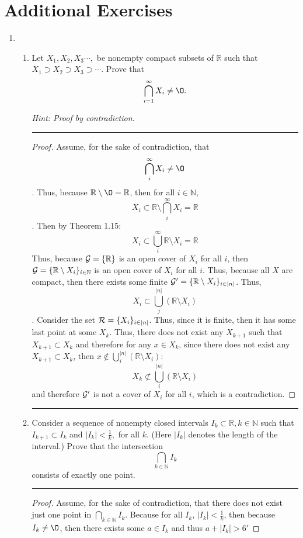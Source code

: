 \documentclass[openany, amssymb, psamsfonts]{amsart}
\newcommand{\bbN}{\mathbb{N}}
\newcommand{\bbR}{\mathbb{R}}
\renewcommand{\emptyset}{\O}
\newcommand{\sm}{\setminus}
\theoremstyle{definition}
\numberwithin{equation}{section}
\begin{document}
\section*{Additional Exercises}
\begin{enumerate}
\item
\begin{enumerate}
\item Let $X_1,X_2, X_3\cdots,$ be nonempty compact subsets of $\bbR$ such that 
$X_1\supset X_2\supset X_3\supset\cdots .$
Prove that $$\bigcap_{i=1}^\infty X_i\neq \emptyset.$$ 

{\it Hint: Proof by contradiction.}
\vspace{4pt}     \hrule   \vspace{4pt}  \begin{proof}
Assume, for the sake of contradiction, that $$\bigcap_i^{\infty}X_i \neq \emptyset$$. Thus, because $\bbR \sm \emptyset = \bbR$, then for all $i\in \bbN$, $$X_i \subset \bbR \sm \bigcap_i^{\infty}X_i = \bbR$$. Then by Theorem 1.15:
$$X_i \subset \bigcup_i^\infty \bbR \sm X_i = \bbR$$
Thus, because $\cG = \{\bbR\}$ is an open cover of $X_i$ for all $i$, then $\cG = \{\bbR\sm X_i\}_{i\in \bbN}$ is an open cover of $X_i$ for all $i$. Thus, because all $X$ are compact, then there exists some finite $\cG' = \{\bbR \sm X_i\}_{i\in |n|}$. Thus, $$X_i \subset \bigcup_j^{|n|}(\bbR \sm X_i)$$. Consider the set $\mathcal R = \{X_i\}_{i\in |n|}$. Thus, since it is finite, then it has some last point at some $X_k$. Thus, there does not exist any $X_{k+1}$ such that $X_{k+1}\subset X_k$ and therefore for any $x\in X_k$, since there does not exist any $X_{k+1}\subset X_k$, then $x\notin \bigcup_i^{|n|}(\bbR \sm X_i)$:
$$X_k \not \subset \bigcup_i^{|n|}(\bbR \sm X_i)$$
and therefore $\mathcal G'$ is not a cover of $X_i$ for all $i$, which is a contradiction. 
\end{proof}\vspace{4pt}     \hrule   \vspace{4pt}

\item Consider a sequence of nonempty closed intervals $I_k \subset \mathbb{R}, k\in \mathbb{N}$ such that 
$I_{k+1} \subset I_k$ and $|I_k| <\frac{1}{k},$ for all $k.$ (Here $|I_k|$ denotes the length of the interval.) Prove that 
the intersection $$\bigcap_{k\in \mathbb{N}}I_k$$ consists of exactly one point. 
\vspace{4pt}     \hrule   \vspace{4pt}  \begin{proof}
Assume, for the sake of contradiction, that there does not exist just one point in $\bigcap_{k\in \bbN}I_k$. Because for all $I_k$, $|I_k|<\frac{1}{k}$, then because $I_k \neq \emptyset$, then there exists some $a\in I_k$ and thus $a+ |I_k|>6'$


\end{proof}
\end{enumerate}
\end{enumerate}
\end{document}
